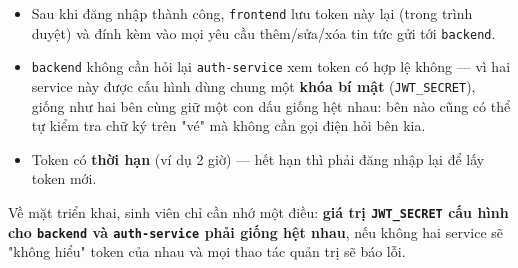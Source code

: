 \documentclass[a4paper,11pt]{article}
\begin{document}
\begin{itemize}[itemsep=3pt]
  \item Sau khi đăng nhập thành công, \texttt{frontend} lưu token này lại (trong trình duyệt) và đính kèm vào mọi yêu cầu thêm/sửa/xóa tin tức gửi tới \texttt{backend}.
  \item \texttt{backend} không cần hỏi lại \texttt{auth-service} xem token có hợp lệ không — vì hai service này được cấu hình dùng chung một \textbf{khóa bí mật} (\texttt{JWT\_SECRET}), giống như hai bên cùng giữ một con dấu giống hệt nhau: bên nào cũng có thể tự kiểm tra chữ ký trên "vé" mà không cần gọi điện hỏi bên kia.
  \item Token có \textbf{thời hạn} (ví dụ 2 giờ) — hết hạn thì phải đăng nhập lại để lấy token mới.
\end{itemize}

Về mặt triển khai, sinh viên chỉ cần nhớ một điều: \textbf{giá trị \texttt{JWT\_SECRET} cấu hình cho \texttt{backend} và \texttt{auth-service} phải giống hệt nhau}, nếu không hai service sẽ "không hiểu" token của nhau và mọi thao tác quản trị sẽ báo lỗi.
\end{document}
